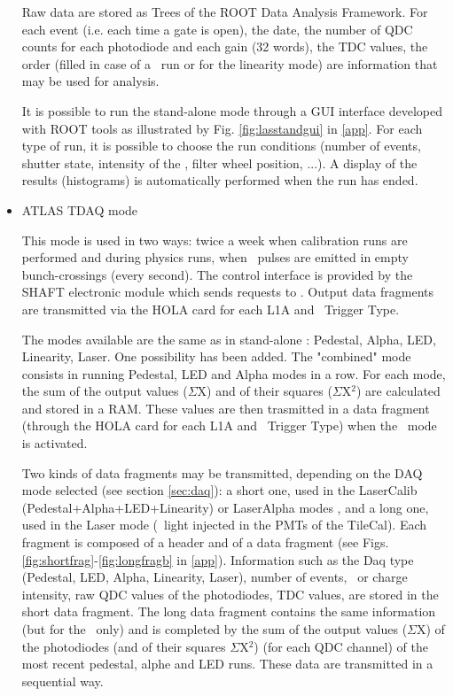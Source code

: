 \begin{itemize}
Raw data are stored as Trees of the ROOT \cite{ref:root} Data Analysis Framework. For each event (i.e. each time a gate is open), the date, the number of QDC counts for each photodiode and each gain (32 words), the TDC values, the order (filled in case of a \laser~run or for the linearity mode) are information that may be used for analysis. 

It is possible to run the stand-alone mode through a GUI interface developed with ROOT tools as illustrated by Fig. \ref{fig:lasstandgui} in \ref{app}. For each type of run, it is possible to choose the run conditions (number of events, shutter state, intensity of the \laser, filter wheel position, ...). A display of the results (histograms) is automatically performed when the run has ended.

\item ATLAS TDAQ mode

This mode is used in two ways: twice a week when calibration runs are performed and during physics runs, when \laser~pulses are emitted in empty bunch-crossings (every second). The control interface is provided by the SHAFT electronic module which sends requests to \lascar. Output data fragments are transmitted via the HOLA card for each L1A and \laser~Trigger Type.

The modes available are the same as in stand-alone : Pedestal, Alpha, LED, Linearity, Laser. One possibility has been added. The "combined" mode consists in running Pedestal, LED and Alpha modes in a row. For each mode, the sum of the output values ($\Sigma$X) and of their squares ($\Sigma$X$^{2}$) are calculated and stored in a RAM. These values are then trasmitted in a data fragment (through the HOLA card for each L1A and \laser~Trigger Type) when the \laser~mode is activated.

Two kinds of data fragments may be transmitted, depending on the DAQ mode selected (see section \ref{sec:daq}): a short one, used in the LaserCalib (Pedestal+Alpha+LED+Linearity) or LaserAlpha modes , and a long one, used in the Laser mode (\laser~light injected in the PMTs of the TileCal). Each fragment is composed of a header and of a data fragment (see Figs. \ref{fig:shortfrag}-\ref{fig:longfragb} in \ref{app}). Information such as the Daq type (Pedestal, LED, Alpha, Linearity, Laser), number of events, \laser~or charge intensity, raw QDC values of the photodiodes, TDC values, are stored in the short data fragment. The long data fragment contains the same information (but for the \laser~only) and is completed by the sum of the output values ($\Sigma$X) of the photodiodes (and of their squares $\Sigma$X$^{2}$) (for each QDC channel) of the most recent pedestal, alphe and LED runs. These data are transmitted in a sequential way. 

\end{itemize}
